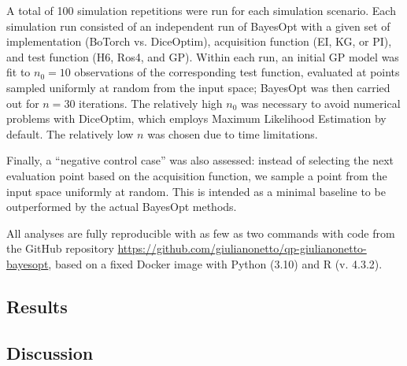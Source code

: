 A total of 100 simulation repetitions were run for each simulation scenario. Each simulation run consisted of an independent run of BayesOpt with a given set of implementation (BoTorch vs. DiceOptim), acquisition function (EI, KG, or PI), and test function (H6, Ros4, and GP). Within each run, an initial GP model was fit to $n_0=10$ observations of the corresponding test function, evaluated at points sampled uniformly at random from the input space; BayesOpt was then carried out for $n=30$ iterations. The relatively high $n_0$ was necessary to avoid numerical problems with DiceOptim, which employs Maximum Likelihood Estimation by default. The relatively low $n$ was chosen due to time limitations.

Finally, a ``negative control case'' was also assessed: instead of selecting the next evaluation point based on the acquisition function, we sample a point from the input space uniformly at random. This is intended as a minimal baseline to be outperformed by the actual BayesOpt methods.

All analyses are fully reproducible with as few as two commands with code from the GitHub repository \href{https://github.com/giulianonetto/qp-giulianonetto-bayesopt}{https://github.com/giulianonetto/qp-giulianonetto-bayesopt}, based on a fixed Docker image \cite{merkel2014} with Python (3.10) and R (v. 4.3.2).
\subsection{Results}


\subsection{Discussion}